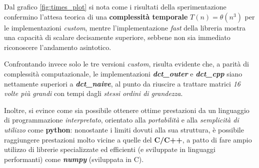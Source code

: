     Dal grafico \ref{fig:times_plot} si nota come i risultati della sperimentazione confermino l'attesa teorica di una \textbf{complessità temporale} $T(n) = \theta(n^3)$ per le implementazioni \textit{custom}, mentre l'implementazione \textit{fast} della libreria mostra una capacità di scalare decisamente superiore, sebbene non sia immediato riconoscere l'andamento asintotico. 
    
    Confrontando invece solo le tre versioni \textit{custom}, risulta evidente che, a parità di complessità computazionale, le implementazioni \textbf{\textit{dct\_outer}} e \textbf{\textit{dct\_cpp}} siano nettamente superiori a \textbf{\textit{dct\_naive}}, al punto da riuscire a trattare matrici \textit{16 volte più grandi} con tempi dagli \textit{stessi ordini di grandezza}.

    Inoltre, si evince come sia possibile ottenere ottime prestazioni da un linguaggio di programmazione \textit{interpretato}, orientato alla \textit{portabilità} e alla \textit{semplicità di utilizzo} come \textbf{python}: nonostante i limiti dovuti alla sua struttura, è possibile raggiungere prestazioni molto vicine a quelle del \textbf{C/C++}, a patto di fare ampio utilizzo di librerie specializzate ed efficienti (e sviluppate in linguaggi performanti) come \textbf{\textit{numpy}} (sviluppata in C). 